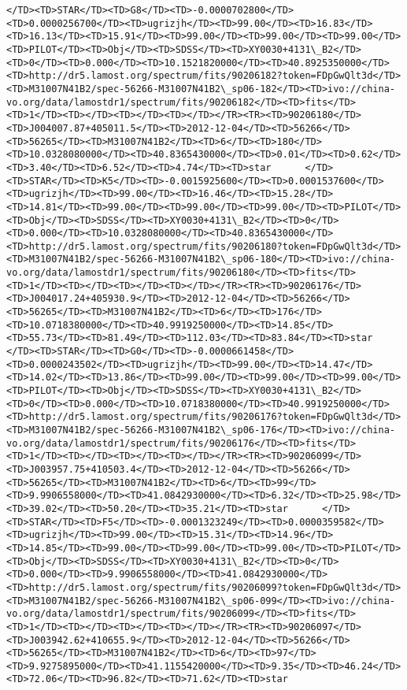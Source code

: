 \documentclass[11pt]{article}
\begin{document}
\begin{Verbatim}[commandchars=\\\{\}]
</TD><TD>STAR</TD><TD>G8</TD><TD>-0.0000702800</TD><TD>0.0000256700</TD><TD>ugrizjh</TD><TD>99.00</TD><TD>16.83</TD><TD>16.13</TD><TD>15.91</TD><TD>99.00</TD><TD>99.00</TD><TD>99.00</TD><TD>PILOT</TD><TD>Obj</TD><TD>SDSS</TD><TD>XY0030+4131\_B2</TD><TD>0</TD><TD>0.000</TD><TD>10.1521820000</TD><TD>40.8925350000</TD><TD>http://dr5.lamost.org/spectrum/fits/90206182?token=FDpGwQlt3d</TD><TD>M31007N41B2/spec-56266-M31007N41B2\_sp06-182</TD><TD>ivo://china-vo.org/data/lamostdr1/spectrum/fits/90206182</TD><TD>fits</TD><TD>1</TD><TD></TD><TD></TD><TD></TD></TR><TR><TD>90206180</TD><TD>J004007.87+405011.5</TD><TD>2012-12-04</TD><TD>56266</TD><TD>56265</TD><TD>M31007N41B2</TD><TD>6</TD><TD>180</TD><TD>10.0328080000</TD><TD>40.8365430000</TD><TD>0.01</TD><TD>0.62</TD><TD>3.40</TD><TD>6.52</TD><TD>4.74</TD><TD>star      </TD><TD>STAR</TD><TD>K5</TD><TD>-0.0015925600</TD><TD>0.0001537600</TD><TD>ugrizjh</TD><TD>99.00</TD><TD>16.46</TD><TD>15.28</TD><TD>14.81</TD><TD>99.00</TD><TD>99.00</TD><TD>99.00</TD><TD>PILOT</TD><TD>Obj</TD><TD>SDSS</TD><TD>XY0030+4131\_B2</TD><TD>0</TD><TD>0.000</TD><TD>10.0328080000</TD><TD>40.8365430000</TD><TD>http://dr5.lamost.org/spectrum/fits/90206180?token=FDpGwQlt3d</TD><TD>M31007N41B2/spec-56266-M31007N41B2\_sp06-180</TD><TD>ivo://china-vo.org/data/lamostdr1/spectrum/fits/90206180</TD><TD>fits</TD><TD>1</TD><TD></TD><TD></TD><TD></TD></TR><TR><TD>90206176</TD><TD>J004017.24+405930.9</TD><TD>2012-12-04</TD><TD>56266</TD><TD>56265</TD><TD>M31007N41B2</TD><TD>6</TD><TD>176</TD><TD>10.0718380000</TD><TD>40.9919250000</TD><TD>14.85</TD><TD>55.73</TD><TD>81.49</TD><TD>112.03</TD><TD>83.84</TD><TD>star      </TD><TD>STAR</TD><TD>G0</TD><TD>-0.0000661458</TD><TD>0.0000243502</TD><TD>ugrizjh</TD><TD>99.00</TD><TD>14.47</TD><TD>14.02</TD><TD>13.86</TD><TD>99.00</TD><TD>99.00</TD><TD>99.00</TD><TD>PILOT</TD><TD>Obj</TD><TD>SDSS</TD><TD>XY0030+4131\_B2</TD><TD>0</TD><TD>0.000</TD><TD>10.0718380000</TD><TD>40.9919250000</TD><TD>http://dr5.lamost.org/spectrum/fits/90206176?token=FDpGwQlt3d</TD><TD>M31007N41B2/spec-56266-M31007N41B2\_sp06-176</TD><TD>ivo://china-vo.org/data/lamostdr1/spectrum/fits/90206176</TD><TD>fits</TD><TD>1</TD><TD></TD><TD></TD><TD></TD></TR><TR><TD>90206099</TD><TD>J003957.75+410503.4</TD><TD>2012-12-04</TD><TD>56266</TD><TD>56265</TD><TD>M31007N41B2</TD><TD>6</TD><TD>99</TD><TD>9.9906558000</TD><TD>41.0842930000</TD><TD>6.32</TD><TD>25.98</TD><TD>39.02</TD><TD>50.20</TD><TD>35.21</TD><TD>star      </TD><TD>STAR</TD><TD>F5</TD><TD>-0.0001323249</TD><TD>0.0000359582</TD><TD>ugrizjh</TD><TD>99.00</TD><TD>15.31</TD><TD>14.96</TD><TD>14.85</TD><TD>99.00</TD><TD>99.00</TD><TD>99.00</TD><TD>PILOT</TD><TD>Obj</TD><TD>SDSS</TD><TD>XY0030+4131\_B2</TD><TD>0</TD><TD>0.000</TD><TD>9.9906558000</TD><TD>41.0842930000</TD><TD>http://dr5.lamost.org/spectrum/fits/90206099?token=FDpGwQlt3d</TD><TD>M31007N41B2/spec-56266-M31007N41B2\_sp06-099</TD><TD>ivo://china-vo.org/data/lamostdr1/spectrum/fits/90206099</TD><TD>fits</TD><TD>1</TD><TD></TD><TD></TD><TD></TD></TR><TR><TD>90206097</TD><TD>J003942.62+410655.9</TD><TD>2012-12-04</TD><TD>56266</TD><TD>56265</TD><TD>M31007N41B2</TD><TD>6</TD><TD>97</TD><TD>9.9275895000</TD><TD>41.1155420000</TD><TD>9.35</TD><TD>46.24</TD><TD>72.06</TD><TD>96.82</TD><TD>71.62</TD><TD>star      
\end{Verbatim}
\end{document}
